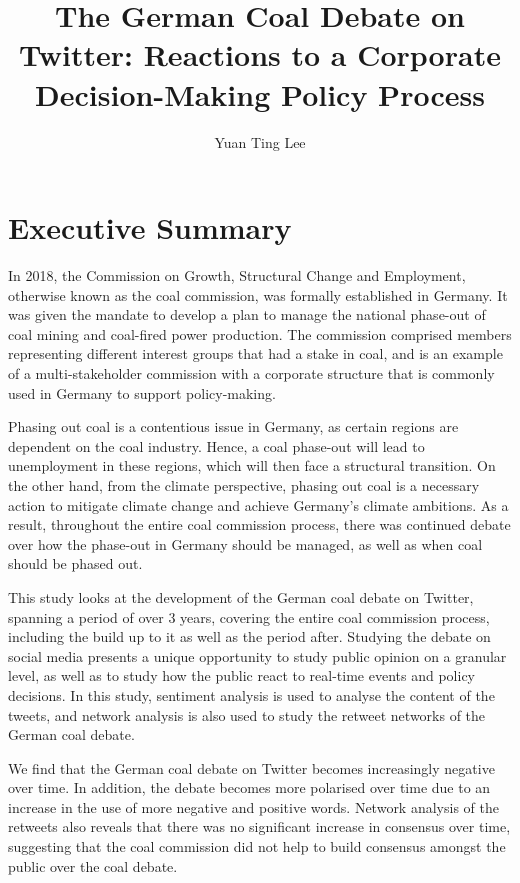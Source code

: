 \documentclass[12pt,onecolumn,twoside]{layout}
\title{The German Coal Debate on Twitter: Reactions to a Corporate Decision-Making Policy Process}
\author[a,b]{Yuan Ting Lee}
\affil[a]{Hertie School, Friedrichstr. 180, Berlin 10117, Germany}
\affil[b]{Mercator Research Institute on Global Commons and Climate Change, Torgauer Str. 12 - 15, Berlin 10829, Germany}
\begin{document}
\onehalfspacing
\maketitle
\thispagestyle{firststyle}

\clearpage
{
	\hypersetup{linkcolor=black}
	\tableofcontents
}

\clearpage
\section{Executive Summary} \label{sec:summary}
In 2018, the Commission on Growth, Structural Change and Employment, otherwise known as the coal commission, was formally established in Germany. It was given the mandate to develop a plan to manage the national phase-out of coal mining and coal-fired power production. The commission comprised members representing different interest groups that had a stake in coal, and is an example of a multi-stakeholder commission with a corporate structure that is commonly used in Germany to support policy-making. 
 
Phasing out coal is a contentious issue in Germany, as certain regions are dependent on the coal industry. Hence, a coal phase-out will lead to unemployment in these regions, which will then face a structural transition. On the other hand, from the climate perspective, phasing out coal is a necessary action to mitigate climate change and achieve Germany's climate ambitions. As a result, throughout the entire coal commission process, there was continued debate over how the phase-out in Germany should be managed, as well as when coal should be phased out. 

This study looks at the development of the German coal debate on Twitter, spanning a period of over 3 years, covering the entire coal commission process, including the build up to it as well as the period after. Studying the debate on social media presents a unique opportunity to study public opinion on a granular level, as well as to study how the public react to real-time events and policy decisions. In this study, sentiment analysis is used to analyse the content of the tweets, and network analysis is also used to study the retweet networks of the German coal debate. 

We find that the German coal debate on Twitter becomes increasingly negative over time. In addition, the debate becomes more polarised over time due to an increase in the use of more negative and positive words. Network analysis of the retweets also reveals that there was no significant increase in consensus over time, suggesting that the coal commission did not help to build consensus amongst the public over the coal debate. 
\end{document}
